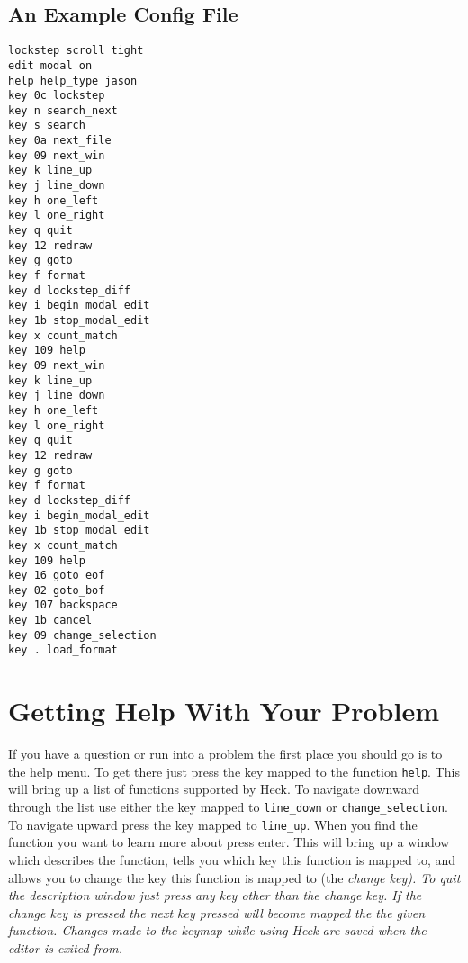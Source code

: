 \documentclass[12pt]{article}
\begin{document}
\subsection{An Example Config File}
\begin{verbatim}
lockstep scroll tight
edit modal on
help help_type jason
key 0c lockstep
key n search_next
key s search
key 0a next_file
key 09 next_win
key k line_up
key j line_down
key h one_left
key l one_right
key q quit
key 12 redraw
key g goto
key f format
key d lockstep_diff
key i begin_modal_edit
key 1b stop_modal_edit
key x count_match
key 109 help
key 09 next_win
key k line_up
key j line_down
key h one_left
key l one_right
key q quit
key 12 redraw
key g goto
key f format
key d lockstep_diff
key i begin_modal_edit
key 1b stop_modal_edit
key x count_match
key 109 help
key 16 goto_eof
key 02 goto_bof
key 107 backspace
key 1b cancel
key 09 change_selection
key . load_format
\end{verbatim}

\section{Getting Help With Your Problem}
\label{Changing The Keymap Through Help}
If you have a question or run into a problem the first place you should go is
to the help menu.  To get there just press the key mapped to the function
\verb#help#.  This will bring up a list of functions supported by Heck.  
To navigate downward through the list use either the key mapped to 
\verb#line_down# or \verb#change_selection#.  To navigate upward press the key 
mapped to \verb#line_up#.  When you find the function you want to learn more 
about press enter.  This will bring up a window which describes the function, 
tells you which key this function is mapped to, and allows you to change the
key this function is mapped to (the \it{}change key\rm{}).  To quit the 
description window just press any key other than the \it{}change key\rm{}.
If the \it{}change key\rm{} is pressed the next key pressed will become 
mapped the the given function.  Changes made to the keymap while using Heck 
are saved when the editor is exited from.
\end{document}
